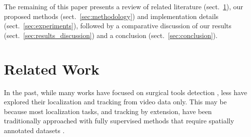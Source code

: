 \documentclass{svjour3}                     \smartqed
\begin{document}
The remaining of this paper presents a review of related literature (sect.~\ref{sec:literature_review}), our proposed methods (sect.~\ref{sec:methodology}) and implementation details (sect.~\ref{sec:experiments}), followed by a comparative discussion of our results (sect.~\ref{sec:results_discussion}) and a conclusion (sect.~\ref{sec:conclusion}).


\section{Related Work}
\label{sec:literature_review}
In the past, while many works have focused on surgical tools detection \cite{tmi:twinanda2017endonet,ipcai:richa2011visual,miccai:sznitman2014fast,miccai:vardazaryan2018weakly,miccai:sznitman2011unified,mai:al2018monitoring,wacv:jin2018tool}, less have explored their localization \cite{miccai:vardazaryan2018weakly,wacv:jin2018tool,mai:rieke2016real} and tracking \cite{ipcai:richa2011visual,miccai:sznitman2011unified,miccai:sznitman2012data} from video data only. This may be because most localization tasks, and tracking by extension, have been traditionally approached with fully supervised methods that require spatially annotated datasets \cite{mai:bouget2017vision}.
\end{document}
